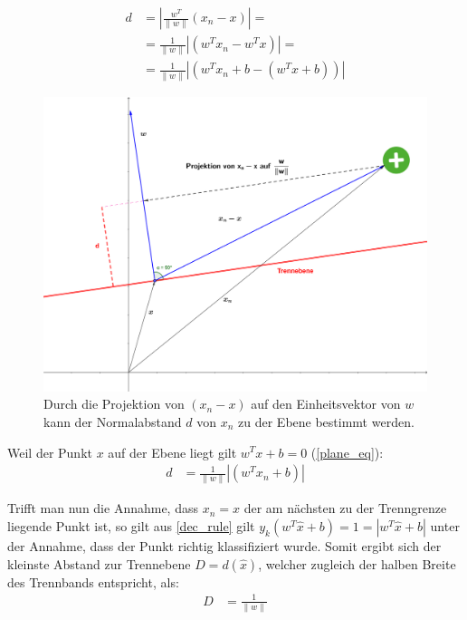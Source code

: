 \documentclass[a4paper,11pt,twoside]{scrreprt}
\newcommand{\norm}[1]{\lVert#1\rVert}
\begin{document}
\begin{equation} \label{distance_to_plane}
	\begin{aligned}
		d &= | \frac{w^{T}}{\lVert w \rVert} (x_{n} - x) | = \\
		&= \frac{1}{\norm{w}} | (w^{T} x_{n} - w^{T} x) | =\\
		&= \frac{1}{\norm{w}} | (w^{T} x_{n} + b - (w^{T} x + b)) |
	\end{aligned}
\end{equation}

\begin{figure}[H]
	\centering
	\includegraphics[width = 13cm]{assets/projection.png}
	\caption{Durch die Projektion von $(x_{n} - x)$ auf den Einheitsvektor von $w$ kann der Normalabstand $d$ von $x_{n}$ zu der Ebene bestimmt werden.}
	\label{fig:projection}
\end{figure}

Weil der Punkt $x$ auf der Ebene liegt gilt $w^{T} x + b = 0$ (\autoref{plane_eq}):
\begin{equation} \label{distance_to_plane_simplified1}
	\begin{aligned}
		d &= \frac{1}{\norm{w}} | (w^{T} x_{n} + b) |
	\end{aligned}
\end{equation}

Trifft man nun die Annahme, dass $x_{n} = \hat{x}$ der am nächsten zu der Trenngrenze liegende Punkt ist, so gilt aus \autoref{dec_rule} gilt $y_{k} (w^{T} \hat{x} + b) = 1 = |w^{T} \hat{x} + b|$ unter der Annahme, dass der Punkt richtig klassifiziert wurde. Somit ergibt sich der kleinste Abstand zur Trennebene $D = d(\hat{x})$, welcher zugleich der halben Breite des Trennbands entspricht, als:
\begin{equation} \label{distance_to_plane_simplified2}
	\begin{aligned}
		D &= \frac{1}{\norm{w}}
	\end{aligned}
\end{equation}
\end{document}
